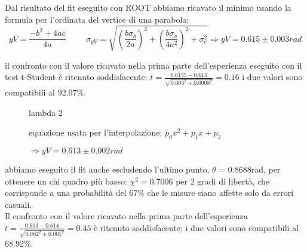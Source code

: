 \documentclass[a4paper]{article}
\theoremstyle{definition}
\begin{document}
Dal risultato del fit eseguito con ROOT abbiamo ricavato il minimo usando la formula per l'ordinata del vertice di una parabola:\\ \[yV = \frac{-b^{2}+4ac}{4a}  \hspace{1cm}  \sigma_{yV} = \sqrt{  \left( \frac{b\sigma_{b}}{2a}\right )^{2} + \left (\frac{b\sigma_{a}}{4a^{2}}\right)^{2} + \sigma_{c}^{2}  } \Rightarrow yV = 0.615 \pm 0.003 rad\]

il confronto con il valore ricavato nella prima parte dell'esperienza eseguito con il test t-Student è ritenuto soddisfacente: \( t = \frac{0.6155 - 0.615}{\sqrt{  0.003^{2}+0.0008^{2}  }} = 0.16\) i due valori sono compatibili al 92.07\%.


\begin{figure}[!htbp]
    	\captionsetup{labelformat=empty}
        \caption{lambda 2}
    \end{figure}


\begin{figure}[!ht]
    	\captionsetup{labelformat=empty}

	\caption{equazione usata per l'interpolazione: $p_{0}x^{2} + p_{1}x + p_{2}$}
	\caption{ $ \Rightarrow yV = 0.613 \pm 0.002rad$}


\end{figure}
\pagebreak
\noindent abbiamo eseguito il fit anche escludendo l'ultimo punto, $\theta$ = 0.8688rad, per ottenere un chi quadro più basso: $\chi^{2} = $0.7006 per 2 gradi di libertà, che corrisponde a una probabilità del 67\% che le misure siano affette solo da errori casuali.\\
\noindent Il confronto con il valore ricavato nella prima parte dell'esperienza\\ \( t = \frac{0.613- 0.614}{\sqrt{  0.002^{2}+0.001^{2}  }} = 0.45\) è ritenuto soddisfacente: i due valori sono compatibili al 68.92\%.\\
\end{document}
